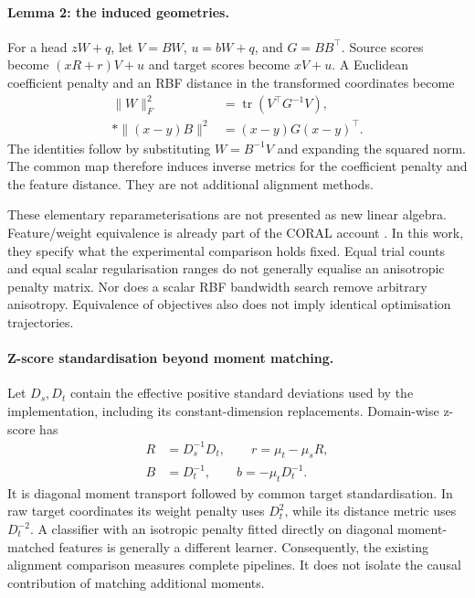 \paragraph{Lemma 2: the induced geometries.}
For a head $zW+q$, let $V=BW$, $u=bW+q$, and $G=BB^\top$. Source scores become
$(xR+r)V+u$ and target scores become $xV+u$. A Euclidean coefficient penalty
and an RBF distance in the transformed coordinates become
\begin{align}
 \lVert W\rVert_F^2 &= \operatorname{tr}(V^\top G^{-1}V),
 \label{eq:penalty-pullback}\\*
 \lVert(x-y)B\rVert^2 &= (x-y)G(x-y)^\top.
 \label{eq:kernel-pullback}
\end{align}
The identities follow by substituting $W=B^{-1}V$ and expanding the squared
norm. The common map therefore induces inverse metrics for the coefficient
penalty and the feature distance. They are not additional alignment methods.

These elementary reparameterisations are not presented as new linear algebra.
Feature/weight equivalence is already part of the CORAL account
\cite{sun2016coral}. In this work, they specify what the experimental
comparison holds fixed. Equal trial counts and equal scalar regularisation
ranges do not generally equalise an anisotropic penalty matrix. Nor does a
scalar RBF bandwidth search remove arbitrary anisotropy. Equivalence of
objectives also does not imply identical optimisation trajectories.

\paragraph{Z-score standardisation beyond moment matching.}
Let $D_s,D_t$ contain the effective positive standard deviations used by the
implementation, including its constant-dimension replacements. Domain-wise
z-score has
\begin{equation}
 \begin{split}
 R&=D_s^{-1}D_t,\qquad r=\mu_t-\mu_sR,\\
 B&=D_t^{-1},\qquad b=-\mu_tD_t^{-1}.
 \end{split}
 \label{eq:zscore-factorisation}
\end{equation}
It is diagonal moment transport followed by common target standardisation.
In raw target coordinates its weight penalty uses $D_t^2$, while its distance
metric uses $D_t^{-2}$. A classifier with an isotropic penalty fitted directly
on diagonal moment-matched features is generally a different learner.
Consequently, the existing alignment comparison measures complete pipelines.
It does not isolate the causal contribution of matching additional moments.

